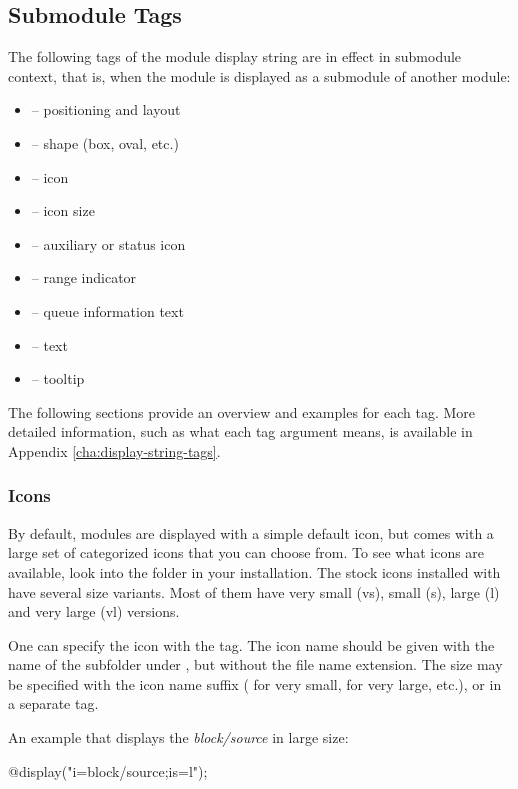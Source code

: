 \subsection{Submodule Tags}

The following tags of the module display string are in effect in submodule
context, that is, when the module is displayed as a submodule of another
module:

\begin{itemize}
  \item {} -- positioning and layout
  \item {} -- shape (box, oval, etc.)
  \item {} -- icon
  \item {} -- icon size
  \item {} -- auxiliary or status icon
  \item {} -- range indicator
  \item {} -- queue information text
  \item {} -- text
  \item {} -- tooltip
\end{itemize}

The following sections provide an overview and examples for each tag. More
detailed information, such as what each tag argument means, is available in
Appendix \ref{cha:display-string-tags}.

\subsubsection{Icons}

By default, modules are displayed with a simple default icon, but {\opp}
comes with a large set of categorized icons that you can choose from.
To see what icons are available, look into the  folder
in your {\opp} installation. The stock icons installed with {\opp} have
several size variants. Most of them have very small (vs), small (s),
large (l) and very large (vl) versions.

One can specify the icon with the  tag. The icon name should be
given with the name of the subfolder under , but without the
file name extension. The size may be specified with the icon name suffix
( for very small,  for very large, etc.), or
in a separate  tag.

An example that displays the \textit{block/source} in large size:

\begin{ned}
@display("i=block/source;is=l");
\end{ned}

